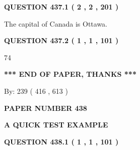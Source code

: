 \documentclass[12pt]{article}
\begin{document}
{\textbf{\Large{QUESTION
437.1 
 ( 2 , 2 , 201 )
}}}
  
  
 
 
\noindent{}
 
 
The capital of Canada is Ottawa.
 
 
 
 
  
\vspace{0.2in}
  
{\textbf{\Large{QUESTION
437.2 
 ( 1 , 1 , 101 )
}}}
  
  
 
 
\noindent{}

74
 
 
   
   
 \vspace{0.2in}
 
   
   
   
   
\vspace{1.0in} 
{\textbf{\large{ *** END OF PAPER, THANKS *** }}} 
   
   
\hspace{1.0in} By: 
 239 ( 416 ,  613 )
   
   
   
   
\newpage 
\setcounter{page}{ 
   438001 } 
   
   
   
   
 {\textbf{ \Large{ PAPER NUMBER  438  }}}
   
   
\vspace{0.2in}
   
   
   
   
   
   
 \vspace{0.2in}
{\LARGE {\textbf{ A QUICK TEST EXAMPLE}}}
   
   
  
\vspace{0.2in}
  
{\textbf{\Large{QUESTION
438.1 
 ( 1 , 1 , 101 )
}}}
  
  
 
 
\noindent{}
\end{document}
